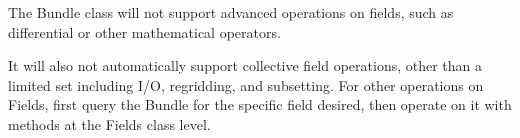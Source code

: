 


The Bundle class will not support advanced
operations on fields, such as differential or other
mathematical operators.

It will also not automatically support collective field operations,
other than a limited set including I/O, regridding, and subsetting.
For other operations on Fields, 
first query the Bundle for the
specific field desired, then operate on it with methods
at the Fields class level.

